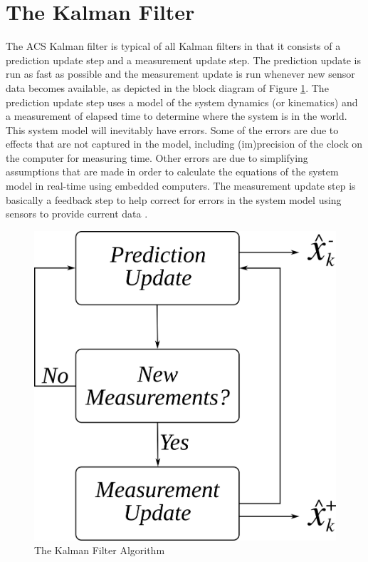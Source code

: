 \section{The Kalman Filter}
\label{sec:kalmanfilter}
The ACS Kalman filter is typical of all Kalman filters in that it consists of a prediction update step and a measurement update step. The prediction update is run as fast as possible and the measurement update is run whenever new sensor data becomes available, as depicted in the block diagram of Figure \ref{fig:kf}. The prediction update step uses a model of the system dynamics (or kinematics) and a measurement of elapsed time to determine where the system is in the world. This system model will inevitably have errors. Some of the errors are due to effects that are not captured in the model, including (im)precision of the clock on the computer for measuring time. Other errors are due to simplifying assumptions that are made in order to calculate the equations of the system model in real-time using embedded computers. The measurement update step is basically a feedback step to help correct for errors in the system model using sensors to provide current data \cite{Kelly_1994_338}.

\begin{figure}[ht!]
	\centering
	\includegraphics[width=.4\textwidth]{images/kf}
	\caption{The Kalman Filter Algorithm}
	\label{fig:kf}
\end{figure}

